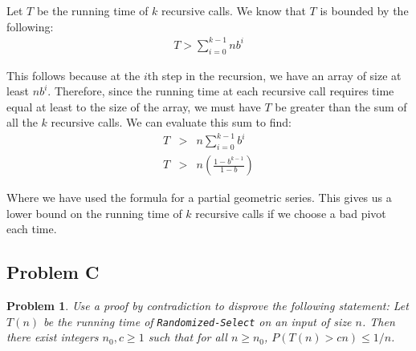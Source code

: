 \documentclass[psamsfonts]{amsart}
\newtheorem{prob}{Problem}[section]
\newenvironment{sol}{{\bfseries Solution}}{\qedsymbol}
\theoremstyle{definition}
\theoremstyle{remark}
\numberwithin{equation}{section}
\begin{document}
\begin{sol}
Let $T$ be the running time of $k$ recursive calls. We know that $T$ is bounded by the following:
\begin{eqnarray}
T > \sum_{i=0}^{k-1} n b^i 
\end{eqnarray}

This follows because at the $i$th step in the recursion, we have an array of size at least $nb^i$. Therefore, since the running time at each recursive call requires time equal at least to the size of the array, we must have $T$ be greater than the sum of all the $k$ recursive calls. We can evaluate this sum to find:
\begin{eqnarray}
T &>& n \sum_{i=0}^{k-1} b^i \\
T &>& n \left( \frac{1 - b^{k-1}}{1-b} \right) 
\end{eqnarray}

Where we have used the formula for a partial geometric series. This gives us a lower bound on the running time of $k$ recursive calls if we choose a bad pivot each time. 
\end{sol}

\subsection{Problem C}

\begin{prob}
Use a proof by contradiction to disprove the following statement: Let $T(n)$ be the running time of \texttt{Randomized-Select} on an input of size $n$. Then there exist integers $n_0, c \geq 1$ such that for all $n \geq n_0$, $P(T(n) > cn) \leq 1/n$. 
\end{prob}
\end{document}
